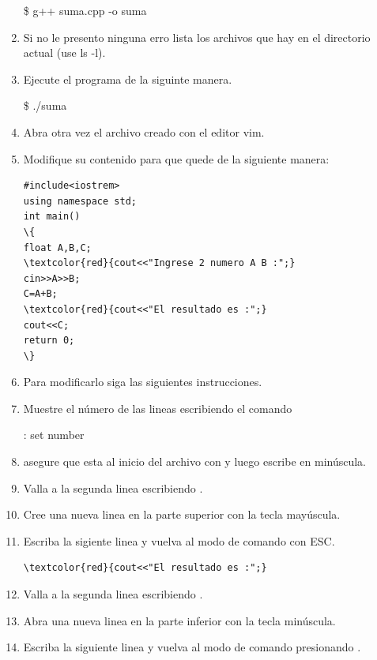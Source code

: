\documentclass[a4paper,12pt,spanish]{article}
\begin{document}
\begin{enumerate}
  
    \begin{tcolorbox}[colback=gray!5]
    \$ g++   suma.cpp   -o   suma
  \end{tcolorbox}

  \item Si no le presento ninguna erro lista los archivos que hay en el directorio actual (use ls
    -l).

  \item Ejecute el programa de la siguinte manera.
    
    \begin{tcolorbox}[colback=gray!5]
    \$ ./suma
  \end{tcolorbox}

  
\item Abra otra vez el archivo creado con el editor vim.
  \item Modifique su contenido para que quede de la siguiente manera:

\begin{Verbatim}[commandchars=\\\{\}]
#include<iostrem>
using namespace std;
int main()
\{
float A,B,C;
\textcolor{red}{cout<<"Ingrese 2 numero A B :";}
cin>>A>>B;
C=A+B;
\textcolor{red}{cout<<"El resultado es :";}
cout<<C;
return 0;
\}
\end{Verbatim}


\item Para modificarlo siga las siguientes instrucciones.
\item Muestre el número de las lineas escribiendo el comando
    \begin{tcolorbox}[colback=gray!5]
    : set number
  \end{tcolorbox}
\item asegure que esta al inicio del archivo con  y
luego escribe  en minúscula.
\item Valla a la segunda linea escribiendo \fbox{\Large :}
.
\item Cree una nueva linea en la parte superior con la tecla  mayúscula.
\item Escriba la sigiente linea y vuelva al modo de comando con ESC.
\begin{Verbatim}[commandchars=\\\{\}]
\textcolor{red}{cout<<"El resultado es :";}
\end{Verbatim}
\item Valla a la segunda linea escribiendo \fbox{\Large :}
.
\item Abra una nueva linea en la parte inferior con la tecla
 minúscula.
\item Escriba la siguiente linea y vuelva al modo de comando presionando 
.


\end{enumerate}
\end{document}
